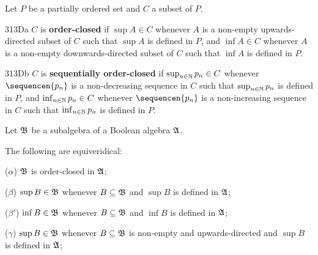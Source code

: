  Let $P$ be a partially ordered set and $C$ a
subset of $P$.

\spheader 313Da $C$ is {\bf order-closed} if $\sup A\in C$ whenever $A$ is a
non-empty upwards-directed subset of $C$ such that $\sup A$ is defined
in $P$, and
$\inf A\in C$ whenever $A$ is a non-empty downwards-directed subset of
$C$ such that $\inf A$ is defined in $P$.

\spheader 313Db $C$ is {\bf sequentially order-closed} if
$\sup_{n\in\Bbb N}p_n\in C$ whenever $\sequencen{p_n}$ is a
non-decreasing sequence in $C$ such
that $\sup_{n\in\Bbb N}p_n$ is defined in $P$, and
$\inf_{n\in\Bbb N}p_n\in C$ whenever $\sequencen{p_n}$ is a
non-increasing sequence in
$C$ such that $\inf_{n\in\Bbb N}p_n$ is defined in $P$.


 Let $\frak B$ be a subalgebra of a Boolean algebra $\frak A$.

\medskip

 The following are equiveridical:

\qquad($\alpha$) $\frak B$ is order-closed in $\frak A$;

\qquad ($\beta$) $\sup B\in\frak B$ whenever $B\subseteq\frak B$ and
$\sup B$ is defined in $\frak A$;

\qquad ($\beta'$) $\inf B\in\frak B$ whenever $B\subseteq\frak B$ and
$\inf B$ is defined in $\frak A$;

\qquad($\gamma$) $\sup B\in\frak B$ whenever
$B\subseteq\frak B$ is non-empty and upwards-directed and $\sup B$ is
defined in $\frak A$;

